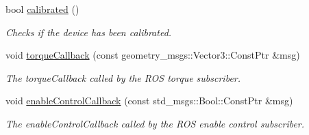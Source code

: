 \begin{DoxyCompactItemize}
bool \hyperlink{classOmniBase_a1b7f1a5010a0676f3446aa6adab1aaa4}{calibrated} ()
\begin{DoxyCompactList}\small\item\em Checks if the device has been calibrated. \end{DoxyCompactList}\item 
void \hyperlink{classOmniBase_a3bec44a6c7adfe6343eb56f20171f08e}{torque\-Callback} (const geometry\-\_\-msgs\-::\-Vector3\-::\-Const\-Ptr \&msg)
\begin{DoxyCompactList}\small\item\em The torque\-Callback called by the R\-O\-S torque subscriber. \end{DoxyCompactList}\item 
void \hyperlink{classOmniBase_ada27c388676a85ab31650cd2c1f8c068}{enable\-Control\-Callback} (const std\-\_\-msgs\-::\-Bool\-::\-Const\-Ptr \&msg)
\begin{DoxyCompactList}\small\item\em The enable\-Control\-Callback called by the R\-O\-S enable control subscriber. \end{DoxyCompactList}\end{DoxyCompactItemize}
